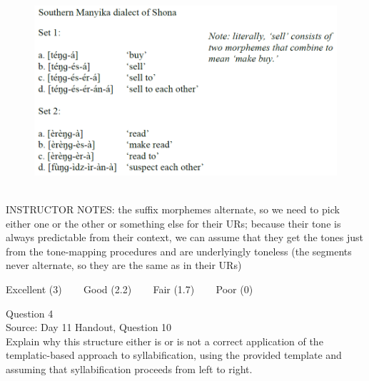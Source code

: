\documentclass[12pt]{article}
\begin{document}
\begin{figure}[H]
\includegraphics{../images/shona.png}
\end{figure}

~\\
INSTRUCTOR NOTES: the suffix morphemes alternate, so we need to pick either one or the other or something else for their URs; because their tone is always predictable from their context, we can assume that they get the tones just from the tone-mapping procedures and are underlyingly toneless (the segments never alternate, so they are the same as in their URs)


\vfill
Excellent (3) ~~~ Good (2.2) ~~~ Fair (1.7) ~~~ Poor (0)
\newpage

{\large Question 4}\\

Source: Day 11 Handout, Question 10\\

Explain why this structure either is or is not a correct application of the templatic-based approach to syllabification, using the provided template and assuming that syllabification proceeds from left to right.\\
\end{document}
